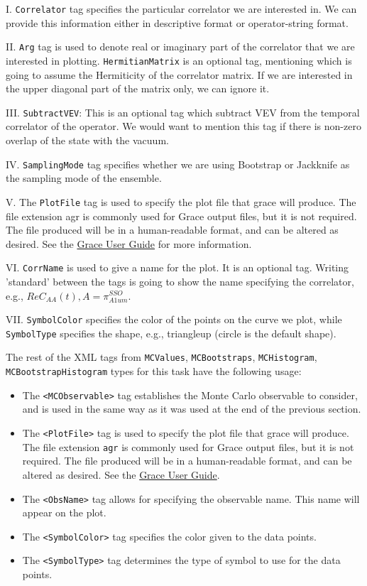 \documentclass[12pt]{article}
\newcommand{\vb}{\texttt}
\begin{document}
I. \vb{Correlator} tag specifies the particular correlator we are interested in. We can provide this information either in descriptive format or operator-string format.

II. \vb{Arg} tag is used to denote real or imaginary part of the correlator that we are interested in plotting.
\vb{HermitianMatrix} is an optional tag, mentioning which is going to assume the Hermiticity of the correlator matrix. If we are interested in the upper diagonal part of the matrix only, we can ignore it.

III. \vb{SubtractVEV}: This is an optional tag which subtract VEV from the temporal correlator of the operator. We would want to mention this tag if there is non-zero overlap of the state with the vacuum. 

IV. \vb{SamplingMode} tag specifies whether we are using Bootstrap or Jackknife as the sampling mode of the ensemble.

V. The \vb{PlotFile} tag is used to specify the plot file that grace will produce. The file extension agr is commonly used for Grace output files, but it is not required. The file produced will be in a human-readable format, and can be altered as desired. See the \href{http://plasma-gate.weizmann.ac.il/Grace/doc/UsersGuide.html}{Grace User Guide}
  for more information.

VI. \vb{CorrName} is used to give a name for the plot. It is an optional tag. Writing 'standard' between the tags is going to show the name specifying the correlator, e.g., $Re C_{AA}(t), A = \pi_{A1um}^{SSO}$.

VII. \vb{SymbolColor} specifies the color of the points on the curve we plot, while \vb{SymbolType} specifies the shape, e.g., triangleup (circle is the default shape).

The rest of the XML tags from \vb{MCValues}, \vb{MCBootstraps}, \vb{MCHistogram}, \vb{MCBootstrapHistogram} types for this task have the following usage:
\begin{itemize}
\item The \vb{<MCObservable>} tag establishes the Monte Carlo observable to consider, and is used
  in the same way as it was used at the end of the previous section.
\item The \vb{<PlotFile>} tag is used to specify the plot file that grace will produce. The file extension
  \vb{agr} is commonly used for Grace output files, but it is not required. The file produced will
  be in a human-readable format, and can be altered as desired.
  See the \href{http://plasma-gate.weizmann.ac.il/Grace/doc/UsersGuide.html}{Grace User Guide}.
\item The \vb{<ObsName>} tag allows for specifying the observable name. This name will appear
  on the plot.
\item The \vb{<SymbolColor>} tag specifies the color given to the data points.
\item The \vb{<SymbolType>} tag determines the type of symbol to use for the data points.
\end{itemize}
\end{document}
